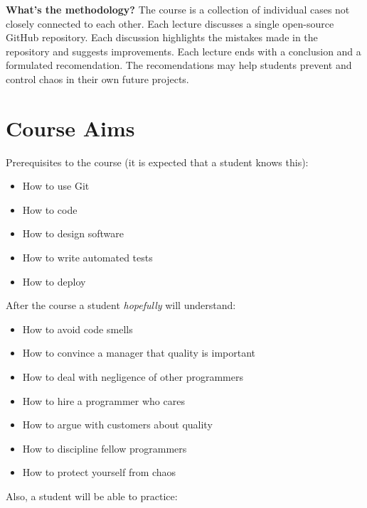 \documentclass[nobrand,anonymous,nodate,nosecurity]{huawei}
\begin{document}
{\textbf{What's the methodology?}
The course is a collection of individual cases not
closely connected to each other. Each lecture discusses a single open-source
GitHub repository. Each discussion highlights the mistakes made in the
repository and suggests improvements. Each lecture ends with a conclusion
and a formulated recomendation. The recomendations may help students
prevent and control chaos in their own future projects.

\newpage
\section*{Course Aims}

Prerequisites to the course (it is expected that a student knows this):

\begin{itemize}
\item How to use Git
\item How to code
\item How to design software
\item How to write automated tests
\item How to deploy
\end{itemize}

After the course a student \emph{hopefully} will understand:

\begin{itemize}
\item How to avoid code smells
\item How to convince a manager that quality is important
\item How to deal with negligence of other programmers
\item How to hire a programmer who cares
\item How to argue with customers about quality
\item How to discipline fellow programmers
\item How to protect yourself from chaos
\end{itemize}

Also, a student will be able to practice:

}
\end{document}
